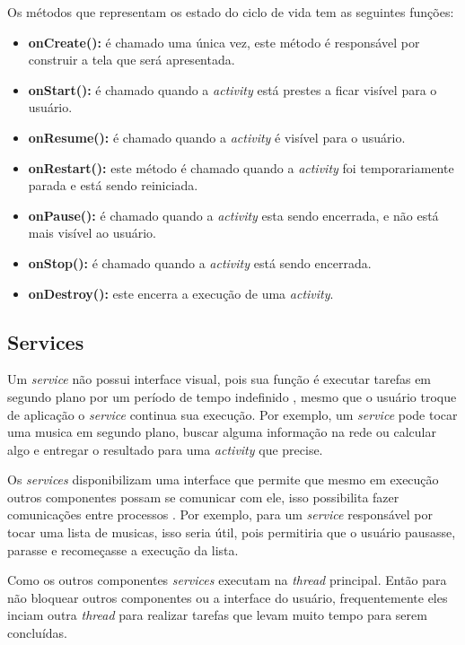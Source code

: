 Os métodos que representam os estado do ciclo de vida tem as seguintes funções:
\begin{itemize}
 \item \textbf{onCreate():} é chamado uma única vez, este método 
 é responsável por construir a tela que será apresentada.
 \item \textbf{onStart():} é chamado quando a \textit{activity} está prestes a ficar visível para o usuário.
 \item \textbf{onResume():} é chamado quando a \textit{activity} é visível para o usuário.
 \item \textbf{onRestart():} este método é chamado quando a \textit{activity} foi temporariamente parada e está 
 sendo reiniciada.
 \item \textbf{onPause():} é chamado quando a \textit{activity} esta sendo encerrada, e não está mais visível ao usuário.
 \item \textbf{onStop():} é chamado quando a \textit{activity} está sendo encerrada.
 \item \textbf{onDestroy():} este encerra a execução de uma \textit{activity}.
\end{itemize}
 
\subsection{Services}
Um \textit{service} não possui interface visual, pois sua função é 
executar tarefas em segundo plano por um período de tempo indefinido \cite{service}, 
mesmo que o usuário troque de aplicação o \textit{service} continua sua execução.
Por exemplo, um \textit{service} pode tocar uma musica em segundo plano, buscar alguma informação na rede 
ou calcular algo e entregar o resultado para uma \textit{activity} que precise. 

  Os \textit{services} disponibilizam uma interface que permite que mesmo em execução outros componentes possam se comunicar com ele, 
  isso possibilita fazer comunicações entre processos \cite{service}.
  Por exemplo, para um \textit{service} responsável por tocar uma lista de musicas, isso seria útil, pois permitiria que o usuário pausasse, parasse e 
  recomeçasse a execução da lista.
  
  Como os outros componentes \textit{services} executam na \textit{thread} principal. Então para não bloquear outros componentes 
  ou a interface do usuário, frequentemente eles inciam outra \textit{thread} para realizar tarefas que levam muito tempo para serem concluídas. 
